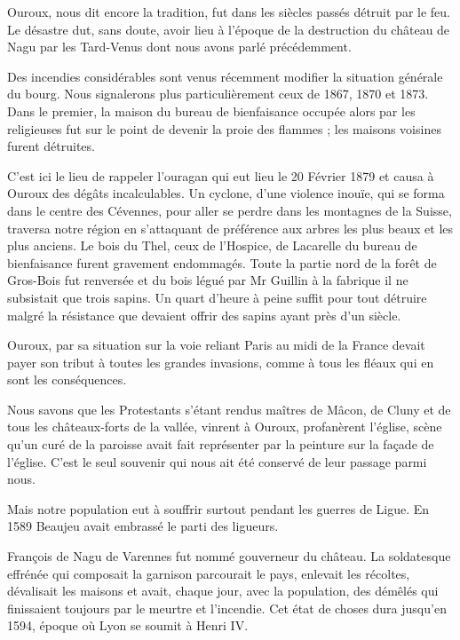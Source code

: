 Ouroux, nous dit encore la tradition, fut dans les siècles passés détruit par le feu. Le désastre dut, sans doute, avoir lieu à l'époque de la destruction du château de Nagu par les Tard-Venus dont nous avons parlé précédemment.

Des incendies considérables sont venus récemment modifier la situation générale du bourg. Nous signalerons plus particulièrement ceux de 1867, 1870 et 1873. Dans le premier, la maison du bureau de bienfaisance occupée alors par les religieuses fut sur le point de devenir la proie des flammes ; les maisons voisines furent détruites.

C'est ici le lieu de rappeler l'ouragan qui eut lieu le 20 Février 1879 et causa à Ouroux des dégâts incalculables. Un cyclone, d'une violence inouïe, qui se forma dans le centre des Cévennes, pour aller se perdre dans les montagnes de la Suisse, traversa
notre région en s'attaquant de préférence aux arbres les plus beaux et les plus anciens. Le bois du Thel, ceux de l'Hospice, de Lacarelle du bureau de bienfaisance furent gravement endommagés. Toute la partie nord de la forêt de Gros-Bois fut renversée et du bois légué par Mr Guillin à la fabrique il ne subsistait que trois sapins. Un quart d'heure à peine suffit pour tout détruire malgré la résistance que devaient offrir des sapins ayant près d'un siècle.

Ouroux, par sa situation sur la voie reliant Paris au midi de la France devait payer son tribut à toutes les grandes invasions, comme à tous les fléaux qui en sont les conséquences.

Nous savons que les Protestants s'étant rendus maîtres de Mâcon, de Cluny et de tous les châteaux-forts de la vallée, vinrent à Ouroux, profanèrent l'église, scène qu'un curé de la paroisse avait fait représenter par la peinture sur la façade de l'église. C'est le seul souvenir qui nous ait été conservé de leur passage parmi nous.

Mais notre population eut à souffrir surtout pendant les guerres de Ligue. En 1589 Beaujeu avait embrassé le parti des ligueurs.

François de Nagu de Varennes fut nommé gouverneur du château. La soldatesque effrénée qui composait la garnison parcourait le pays, enlevait les récoltes, dévalisait les maisons et avait, chaque jour, avec la population, des démêlés qui finissaient toujours par le meurtre et l'incendie. Cet état de choses dura jusqu'en 1594, époque où Lyon se soumit à Henri IV.

